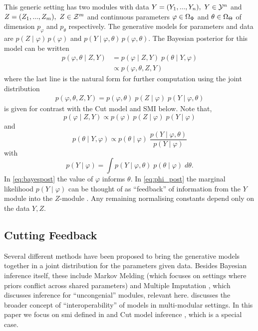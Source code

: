 This generic setting has two modules with data $Y=(Y_1,...,Y_n),\ Y\in \mathcal{Y}^n$ and $Z=(Z_1,...,Z_m),\ Z\in \mathcal{Z}^m$ and continuous parameters $\varphi\in {\Omega_\Phi}$ and $\theta\in {\Omega_\Theta}$ of dimension $p_\varphi$ and $p_\theta$ respectively.
The generative models for parameters and data are $p(Z\mid \varphi)\,p(\varphi)$ and $p(Y\mid \varphi,\theta)\,p(\varphi,\theta)$.
The Bayesian posterior for this model can be written
\begin{align}
  p(\varphi,\theta \mid Z, Y) & = p(\varphi \mid Z, Y) \; p(\theta\mid Y, \varphi ) \label{eq:bayespost} \\
                              & \propto p(\varphi,\theta, Z, Y) \label{eq:bayespost2}
\end{align}
where the last line is the natural form for further computation using the joint distribution
\begin{align}\label{eq:joint_toymodel}
  p(\varphi,\theta, Z, Y) = p(\varphi,\theta)\; p(Z\mid \varphi)\; p(Y\mid \varphi,\theta)
\end{align}
 is given for contrast with the Cut model and SMI below.
Note that,
\begin{equation}\label{eq:phi_post}
  p(\varphi \mid Z, Y)\propto p(\varphi) \; p(Z\mid \varphi) \; p(Y\mid \varphi)
\end{equation}
and
\[
  p(\theta\mid Y, \varphi )\propto p(\theta\mid \varphi)\; \frac{p(Y\mid \varphi,\theta)}{p(Y\mid \varphi)}
\]
with
\[
  p(Y\mid \varphi)=\int p(Y\mid \varphi,\theta)\; p(\theta\mid \varphi) \; d\theta.
\]
In \cref{eq:bayespost} the value of $\varphi$ informs $\theta$.
In \cref{eq:phi_post} the marginal likelihood $p(Y\mid \varphi)$ can be thought of as ``feedback'' of information from the $Y$ module into the $Z$-module \citep{Liu2009modularization, Plummer2015cut, Jacob2017together}.
Any remaining normalising constants depend only on the data $Y,Z$.

\subsection*{Cutting Feedback}

Several different methods have been proposed to bring the generative models together in a joint distribution for the parameters given data.
%
Besides Bayesian inference itself, these include Markov Melding \citep{Goudie2019melding} (which focuses on settings where priors conflict across shared parameters) and Multiple Imputation \citep{Meng1994imputation}, which discusses inference for ``uncongenial'' modules, relevant here.
%
\cite{Nicholson2021covid} discusses the broader concept of ``interoperability'' of models in multi-modular settings.
%
In this paper we focus on \acrfull*{smi} defined in \cite{Carmona2020smi} and Cut model inference \citep{Plummer2015cut}, which is a special case.

